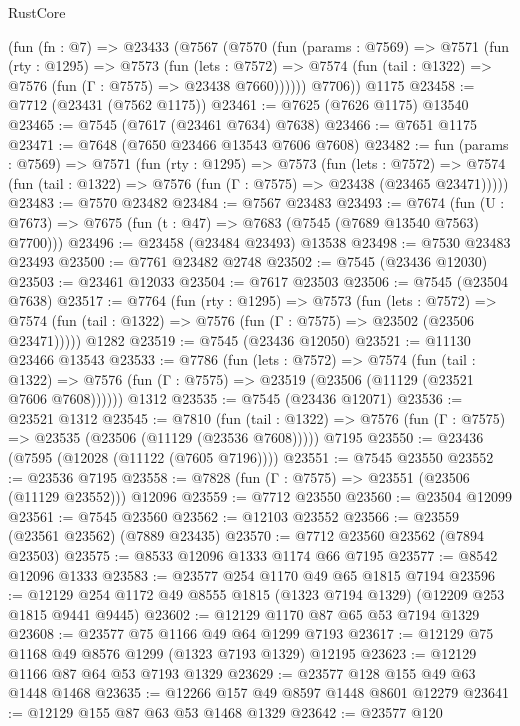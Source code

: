 \begin{lexlean}{RustCore}
\begin{coremodule}
    (fun (fn : @7) =>
    @23433
      (@7567
        (@7570
          (fun (params : @7569) =>
          @7571
            (fun (rty : @1295) =>
            @7573
              (fun (lets : @7572) =>
              @7574 (fun (tail : @1322) => @7576 (fun (Γ : @7575) => @23438 @7660))))))
        @7706))
    @1175
@23458 := @7712 (@23431 (@7562 @1175))
@23461 := @7625 (@7626 @1175) @13540
@23465 := @7545 (@7617 (@23461 @7634) @7638)
@23466 := @7651 @1175
@23471 := @7648 (@7650 @23466 @13543 @7606 @7608)
@23482 := fun (params : @7569) =>
  @7571
    (fun (rty : @1295) =>
    @7573
      (fun (lets : @7572) =>
      @7574 (fun (tail : @1322) => @7576 (fun (Γ : @7575) => @23438 (@23465 @23471)))))
@23483 := @7570 @23482
@23484 := @7567 @23483
@23493 := @7674
    (fun (U : @7673) => @7675 (fun (t : @47) => @7683 (@7545 (@7689 @13540 @7563) @7700)))
@23496 := @23458 (@23484 @23493) @13538
@23498 := @7530 @23483 @23493
@23500 := @7761 @23482 @2748
@23502 := @7545 (@23436 @12030)
@23503 := @23461 @12033
@23504 := @7617 @23503
@23506 := @7545 (@23504 @7638)
@23517 := @7764
    (fun (rty : @1295) =>
    @7573
      (fun (lets : @7572) =>
      @7574 (fun (tail : @1322) => @7576 (fun (Γ : @7575) => @23502 (@23506 @23471)))))
    @1282
@23519 := @7545 (@23436 @12050)
@23521 := @11130 @23466 @13543
@23533 := @7786
    (fun (lets : @7572) =>
    @7574
      (fun (tail : @1322) =>
      @7576 (fun (Γ : @7575) => @23519 (@23506 (@11129 (@23521 @7606 @7608))))))
    @1312
@23535 := @7545 (@23436 @12071)
@23536 := @23521 @1312
@23545 := @7810
    (fun (tail : @1322) => @7576 (fun (Γ : @7575) => @23535 (@23506 (@11129 (@23536 @7608)))))
    @7195
@23550 := @23436 (@7595 (@12028 (@11122 (@7605 @7196))))
@23551 := @7545 @23550
@23552 := @23536 @7195
@23558 := @7828 (fun (Γ : @7575) => @23551 (@23506 (@11129 @23552))) @12096
@23559 := @7712 @23550
@23560 := @23504 @12099
@23561 := @7545 @23560
@23562 := @12103 @23552
@23566 := @23559 (@23561 @23562) (@7889 @23435)
@23570 := @7712 @23560 @23562 (@7894 @23503)
@23575 := @8533 @12096 @1333 @1174 @66 @7195
@23577 := @8542 @12096 @1333
@23583 := @23577 @254 @1170 @49 @65 @1815 @7194
@23596 := @12129 @254 @1172 @49 @8555 @1815 (@1323 @7194 @1329) (@12209 @253 @1815 @9441 @9445)
@23602 := @12129 @1170 @87 @65 @53 @7194 @1329
@23608 := @23577 @75 @1166 @49 @64 @1299 @7193
@23617 := @12129 @75 @1168 @49 @8576 @1299 (@1323 @7193 @1329) @12195
@23623 := @12129 @1166 @87 @64 @53 @7193 @1329
@23629 := @23577 @128 @155 @49 @63 @1448 @1468
@23635 := @12266 @157 @49 @8597 @1448 @8601 @12279
@23641 := @12129 @155 @87 @63 @53 @1468 @1329
@23642 := @23577 @120

\end{coremodule}
\end{lexlean}
